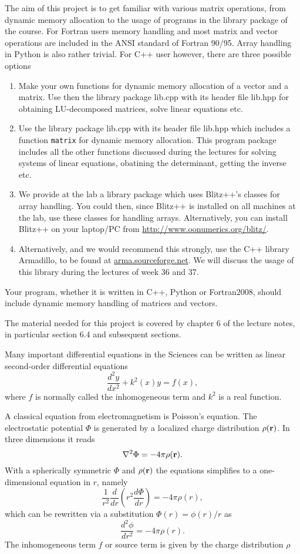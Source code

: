 \documentclass[11pt,a4wide]{article}
\begin{document}
The aim of this project is to get familiar with various matrix operations,
from dynamic memory allocation to the usage of programs in the library
package of the course. 
For Fortran users memory handling and most matrix and vector operations
are included in the ANSI standard of Fortran 90/95. Array handling in Python is also rather trivial. For C++ user however,
there are three possible options
\begin{enumerate}
\item Make your own functions for dynamic memory allocation of a 
vector and a matrix. Use then the 
library package lib.cpp with its header file 
lib.hpp for obtaining LU-decomposed matrices, solve linear equations
etc.
\item Use the library package lib.cpp with its header file 
lib.hpp which includes a function \verb?matrix? for dynamic memory
allocation. This program package includes all the other functions
discussed during the lectures for solving systems of linear equations,
obatining the determinant, getting the inverse etc.
\item We provide at the lab a library package
which uses Blitz++'s classes for array handling. You could then, since
Blitz++ is installed on all machines at the lab, use these classes for handling
arrays. Alternatively, you can install Blitz++ on your laptop/PC from
\url{http://www.oonumerics.org/blitz/}.
\item Alternatively, and we would recommend this strongly, use the C++ library Armadillo, to be found at \url{arma.sourceforge.net}.  We will discuss the usage of this library during the lectures of week 36 and 37.
\end{enumerate}

Your program, whether it is written in C++, Python 
or Fortran2008, should include
dynamic memory handling of matrices and vectors. 

The material needed for this project is covered by chapter 6 of the lecture notes, in particular section 6.4 and subsequent sections.



Many important differential equations in the Sciences can be written as 
linear second-order differential equations 
\[
\frac{d^2y}{dx^2}+k^2(x)y = f(x),
\]
where $f$ is normally called the inhomogeneous term and $k^2$ is a real function.

A classical equation from electromagnetism is Poisson's equation.
The electrostatic potential $\Phi$ is generated by a localized charge
distribution $\rho ({\bf r})$.   In three dimensions 
it reads
\[
\nabla^2 \Phi = -4\pi \rho ({\bf r}).
\]
With a spherically symmetric $\Phi$ and $\rho ({\bf r})$  the equations
simplifies to a one-dimensional equation in $r$, namely
\[
\frac{1}{r^2}\frac{d}{dr}\left(r^2\frac{d\Phi}{dr}\right) = -4\pi \rho(r),
\]
which can be rewritten via a substitution $\Phi(r)= \phi(r)/r$ as
\[
\frac{d^2\phi}{dr^2}= -4\pi\rho(r).
\]
The inhomogeneous term $f$ or source term is given by the charge distribution
$\rho$
\end{document}
